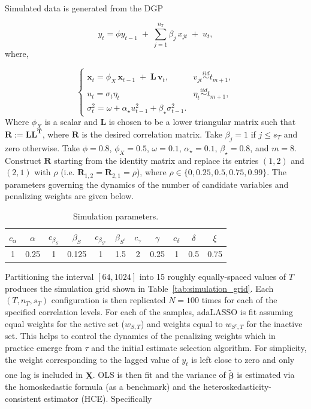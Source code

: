 \documentclass[10pt,a4paper,oneside]{article}
\begin{document}
Simulated data is generated from the DGP

\begin{equation*}
y_t 
= 
\displaystyle \phi y_{t - 1}
\;+\;
\sum^{n_T}_{j = 1} \beta_j\,x_{j t}
\;+\; u_t,  
\end{equation*}
where,

\[
\begin{cases}
\mathbf{x}_t=
\displaystyle \phi_X \,\mathbf{x}_{t-1}
\;+\;
\mathbf{L}\,\mathbf{v}_t,
&
v_{jt} \overset{iid}{\sim} t_{m + 1},\\[2ex]
u_t = \sigma_t \eta_t 
&
\eta_t \overset{iid}{\sim} t_{m + 1},\\[2ex]
\sigma^2_t = \omega + \alpha_{\star} u_{t - 1}^2 + \beta_{\star} \sigma^2_{t - 1}.
\end{cases}
\]
Where $\phi_X$ is a scalar and $\mathbf{L}$ is chosen to be a lower triangular matrix such that $\mathbf{R} := \mathbf{L} \mathbf{L^T}$, where $\mathbf{R}$ is the desired correlation matrix. Take $\beta_j = 1$ if $j \leq s_T$ and zero otherwise. Take $\phi = 0.8$, $\phi_X = 0.5$, $\omega = 0.1$, $\alpha_\star = 0.1$, $\beta_\star = 0.8$, and $m = 8$. Construct $\mathbf{R}$ starting from the identity matrix and replace its entries $(1, 2)$ and $(2, 1)$ with $\rho$ (i.e. $\mathbf{R}_{1,2} = \mathbf{R}_{2,1} = \rho$), where $\rho \in \{0, 0.25, 0.5, 0.75, 0.99 \}$. The parameters governing the dynamics of the number of candidate variables and penalizing weights are given below.


\begin{table}[h]
\centering
\begin{tabular}{ccccccccccc}
\hline
$c_{\alpha}$ & $\alpha$ & $c_{\beta_{S}}$ & $\beta_{S}$ & $c_{\beta_{S^c}}$ & $\beta_{S^c}$ & $c_{\gamma}$ & $\gamma$ & $c_{\delta}$ & $\delta$ & $\xi$ \\
\hline
1 & 0.25 & 1 & 0.125 & 1 & 1.5 & 2 & 0.25 & 1 & 0.5 & 0.75 \\
\hline
\end{tabular}
\caption{Simulation parameters.}
\end{table}

Partitioning the interval $[64,1024]$ into 15 roughly equally‐spaced values of $T$ produces the simulation grid shown in Table~\ref{tab:simulation_grid}.  Each $(T,n_T,s_T)$ configuration is then replicated $N=100$ times for each of the specified correlation levels. For each of the samples, adaLASSO is fit assuming equal weights for the active set ($w_{S,T}$) and weights equal to $w_{S^c, T}$ for the inactive set. This helps to control the dynamics of the penalizing weights which in practice emerge from $\tau$ and the initial estimate selection algorithm. For simplicity, the weight corresponding to the lagged value of $y_t$ is left close to zero and only one lag is included in $\mathbf{X}$. OLS is then fit and the variance of $\hat{\tilde{\boldsymbol{\beta}}}$ is estimated via the homoskedastic formula (as a benchmark) and the heteroskedasticity-consistent estimator (HCE). Specifically
\end{document}
